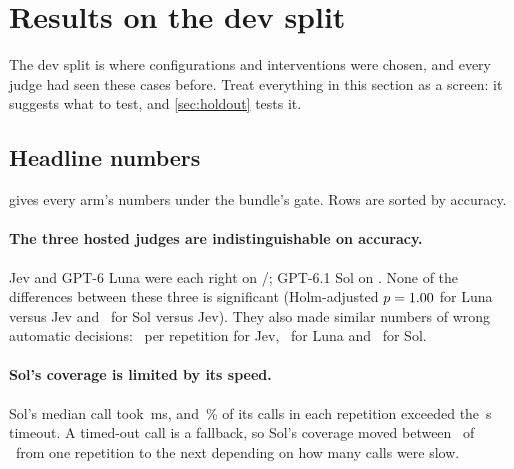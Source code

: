 \section{Results on the dev split \texorpdfstring{\screen}{[screen]}}\label{sec:dev}

The dev split is where configurations and interventions were chosen, and every judge had seen these
cases before. Treat everything in this section as a screen: it suggests what to test, and
\cref{sec:holdout} tests it.

\subsection{Headline numbers}

 gives every arm's numbers under the bundle's gate. Rows are sorted by accuracy.

\begin{table}[htbp]
\centering\small
\caption{Dev split \screen, \DevN\ cases, \DevReps\ repetitions, policy .
Accuracy, wrong-automatic count and coverage are per-case majorities over the repetitions; intervals are
95\,\% Wilson. Latency pools every valid request. ``+ I1'' marks the arms with the side-effect clause
added to their instruction.}
\label{tab:headline-dev}

\end{table}

\paragraph{The three hosted judges are indistinguishable on accuracy.} Jev and GPT-6 Luna were each
right on \JevDevAccK/\DevN; GPT-6.1 Sol on \SolDevAccK. None of the differences between these three is
significant (Holm-adjusted $p = 1.00$ for Luna versus Jev and \SolDevRAccPHolm\ for Sol
versus Jev). They also made similar numbers of wrong automatic decisions: \JevDevWaRange\ per repetition
for Jev, \LunaDevWaRange\ for Luna and \SolDevWaRange\ for Sol.

\paragraph{Sol's coverage is limited by its speed.} Sol's median call took \SolDevPfifty\,ms, and
\SolDevOverTimeoutPct\,\% of its calls in each repetition exceeded the \TimeoutS\,s timeout. A timed-out
call is a fallback, so Sol's coverage moved between \SolDevCovRange\ of \DevN\ from one repetition to
the next depending on how many calls were slow.

